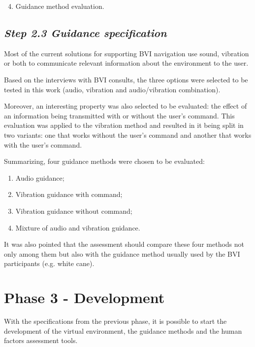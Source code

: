        \begin{enumerate} [label = \Alph*)]
            \setcounter{enumi}{3}
            \item Guidance method evaluation.
        \end{enumerate}

    \subsection*{\textit{Step 2.3 Guidance specification}}
        Most of the current solutions for supporting BVI navigation use sound, vibration or both to communicate relevant information about the environment to the user. 

        Based on the interviews with BVI consults, the three options were selected to be tested in this work (audio, vibration and audio/vibration combination). 

        Moreover, an interesting property was also selected to be evaluated: the effect of an information being transmitted with or without the user’s command. This evaluation was applied to the vibration method and resulted in it being split in two variants: one that works without the user’s command and another that works with the user’s command.

        Summarizing, four guidance methods were chosen to be evaluated:
        \begin{enumerate} [label = \Alph*)]
            \item Audio guidance;
            \item Vibration guidance with command;
            \item Vibration guidance without command;
            \item Mixture of audio and vibration guidance.
        \end{enumerate}

        It was also pointed that the assessment should compare these four methods not only among them but also with the guidance method usually used by the BVI participants (e.g. white cane).
    
    
\section{Phase 3 - Development}
\label{sec:creation_phase}
    
    With the specifications from the previous phase, it is possible to start the development of the virtual environment, the guidance methods and the human factors assessment tools.

